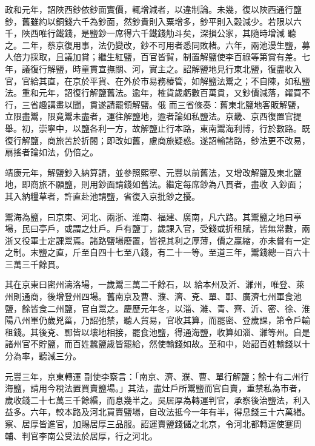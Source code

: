 \begin{pinyinscope}
 政和元年，詔陜西鈔依鈔面實價，輒增減者，以違制論。未幾，復以陜西通行鹽鈔，舊雖約以銅錢六千為鈔面，然鈔貴則入粟增多，鈔平則入穀減少。若限以六千，陜西唯行鐵錢，是鹽鈔一席得六千鐵錢觔斗矣，深損公家，其隨時增減
 聽之。二年，蔡京復用事，法仍變改，鈔不可用者悉同敗楮。六年，兩池漫生鹽，募人倍力採取，且議加賞；繼生紅鹽，百官皆賀，制置解鹽使李百祿等第賞有差。七年，議復行解鹽，時童貫宣撫關、河，實主之。詔解鹽地見行東北鹽，復盡收入官，官給其直，在京於平貨、在外於市易務樁管，如解鹽法鬻之；不自陳，如私鹽法。重和元年，詔復行解鹽舊法。逾年，榷貨歲虧數百萬貫，又鈔價減落，糴買不行，三省趣講畫以聞，貫遂請罷領解鹽。俄
 而三省條奏：舊東北鹽地客販解鹽，立限盡鬻，限竟鬻未盡者，運往解鹽地，逾者論如私鹽法。京畿、京西復置官提舉。初，崇寧中，以鹽各利一方，故解鹽止行本路，東南鬻海利博，行於數路。既復行解鹽，商旅苦於折閱；即改如舊，慮商旅疑惑。遂詔輸諸路，鈔法更不改易，扇搖者論如法，仍倍之。



 靖康元年，解鹽鈔入納算請，並參照熙寧、元豐以前舊法，又增改解鹽及東北鹽地，即商旅不願鹽，則用鈔面請錢如舊法。繼定每席鈔為八貫者，盡收
 入鈔面；其入納糧草者，許直赴池請鹽，省復入京批鈔之擾。



 鬻海為鹽，曰京東、河北、兩浙、淮南、福建、廣南，凡六路。其鬻鹽之地曰亭場，民曰亭戶，或謂之灶戶。戶有鹽丁，歲課入官，受錢或折租賦，皆無常數，兩浙又役軍士定課鬻焉。諸路鹽場廢置，皆視其利之厚薄，價之贏縮，亦未嘗有一定之制。末鹽之直，斤至自四十七至八錢，有二十一等。至道三年，鬻錢總一百六十三萬三千餘貫。



 其在京東曰密州濤洛場，一歲鬻三萬二千餘石，以
 給本州及沂、濰州，唯登、萊州則通商，後增登州四場。舊南京及曹、濮、濟、兗、單、鄆、廣濟七州軍食池鹽，餘皆食二州鹽，官自鬻之。慶歷元年冬，以淄、濰、青、齊、沂、密、徐、淮陽八州軍仍歲兇菑，乃詔弛禁，聽人貿易，官收其算，而罷密、登歲課，第令戶輸租錢。其後兗、鄆皆以壤地相接，罷食池鹽，得通海鹽，收算如淄、濰等州。自是諸州官不貯鹽，而百姓蠶鹽歲皆罷給，然使輸錢如故。至和中，始詔百姓輸錢以十分為率，聽減三分。



 元豐三年，京東轉運
 副使李察言：「南京、濟、濮、曹、單行解鹽；餘十有二州行海鹽，請用今稅法置買賣鹽場。」其法，盡灶戶所鬻鹽而官自賣，重禁私為市者，歲收錢二十七萬三千餘緡，而息幾半之。吳居厚為轉運判官，承察後治鹽法，利入益多。六年，較本路及河北買賣鹽場，自改法抵今一年有半，得息錢三十六萬緡。察、居厚皆進官，加賜居厚三品服。詔運賣鹽錢儲之北京，令河北都轉運使蹇周輔、判官李南公受法於居厚，行之河北。




\end{pinyinscope}
